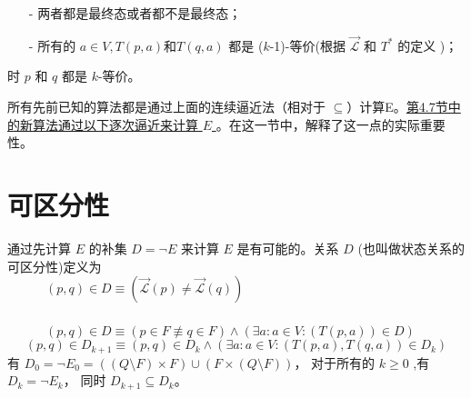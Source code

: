 \begin{itemize}
    \item [-] 两者都是最终态或者都不是最终态；
    \item [-] 所有的 $a\in V,T(p,a) \mbox{和} T(q,a)$ 都是 ($k$-1)-等价(根据 $\overrightarrow{\mathcal{L}}$ 和 $T^*$ 的定义  )；
\end{itemize}
时 $p$ 和 $q$ 都是 $k$-等价。
\newline


所有先前已知的算法都是通过上面的连续逼近法（相对于 $\subseteq$）计算E。\uline{第4.7节中的新算法通过以下逐次逼近来计算 $E$ }。在这一节中，解释了这一点的实际重要性。



\section{可区分性}
通过先计算 $E$ 的补集 $D=\neg E$ 来计算 $E$ 是有可能的。关系 $D$ (也叫做状态关系的可区分性)定义为 \\
\mbox{　　　}$ (p,q) \in D \equiv (\overrightarrow{\mathcal{L}}(p) \not=\overrightarrow{\mathcal{L}}(q)) $\\

 \\
\mbox{　　　}$ (p,q)\in D \equiv (p \in F \not\equiv q \in F) \land (\exists a:a \in V : (T(p,a)) \in D) $\\

$$ (p,q) \in D_{k+1} \equiv (p,q) \in D_k \land ( \exists a:a \in V : (T (p,a),T(q,a))\in D_k)$$
有 $D_0 = \neg E_0 = ( (Q \setminus F) \times F) \cup ( F \times ( Q \setminus F))$， 对于所有的 $k \ge 0$ ,有 $D_k = \neg E_k$， 同时 $D_{k+1} \subseteq D_k $。
\newline

